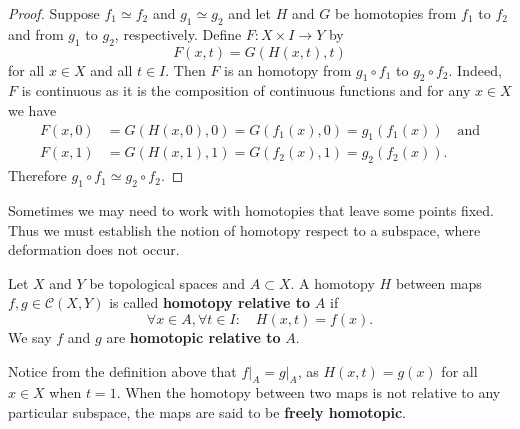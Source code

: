 \begin{proof}
    Suppose \(f_1 \simeq f_2\) and \(g_1 \simeq g_2\) and let \(H\) and \(G\) be homotopies from \(f_1\) to \(f_2\) and from \(g_1\) to \(g_2\), respectively. Define \(F\colon X\times I\to Y\) by \[
        F(x,t) = G(H(x,t),t)
    \] for all \(x\in X\) and all \(t\in I\). Then \(F\) is an homotopy from \(g_1\circ f_1\) to \(g_2\circ f_2\). Indeed, \(F\) is continuous as it is the composition of continuous functions and  for any \(x\in X\) we have \begin{align*}
        F(x,0) &= G(H(x,0),0) = G(f_1(x), 0) = g_1(f_1(x))\quad\text{and}\\
        F(x,1) &= G(H(x,1),1) = G(f_2(x), 1) = g_2(f_2(x)).
    \end{align*}
    Therefore \(g_1\circ f_1 \simeq g_2\circ f_2\).
\end{proof}






Sometimes we may need to work  with homotopies that leave some points fixed. Thus we must establish the notion of homotopy respect to a subspace, where deformation does not occur.

\begin{definitionn}
    Let \(X\) and \(Y\) be topological spaces and \(A\subset X\). A homotopy \(H\) between   maps \(f,g\in \mathcal{C}(X,Y)\) is called \textbf{homotopy relative to} \(A\) if \[
        \forall x\in A,\forall t\in I : \quad H(x,t) = f(x).
    \] We say \(f\) and \(g\) are \textbf{homotopic relative to} \(A\).
\end{definitionn}

Notice from the definition above that \( f\rvert_A = g\rvert_A \), as \(H(x,t) = g(x)\) for all \(x\in X\) when \(t=1\). When the homotopy between two maps is not relative to any particular subspace, the maps are said to be  \textbf{freely homotopic}.


